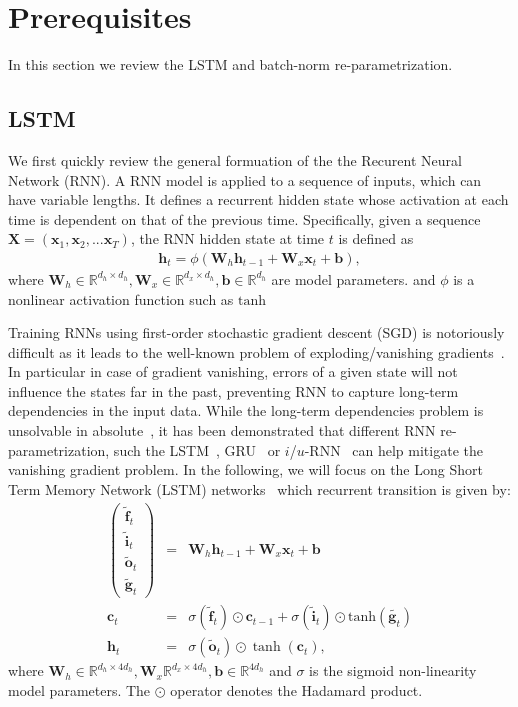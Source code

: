 \documentclass{article} %
\newcommand{\vect}[1]{\mathbf{#1}}
\newcommand{\mat}[1]{\mathbf{#1}}
\newcommand{\ewprod}{\odot}
\newcommand{\reals}{\mathbb{R}}
\begin{document}
\section{Prerequisites}
\label{sec:prerequisites}

In this section we review the LSTM and batch-norm re-parametrization.

\subsection{LSTM}

We first quickly review the general formuation of the the Recurent Neural Network (RNN).
A RNN model is applied to a sequence of inputs, which can have variable lengths.
It defines a recurrent hidden state whose activation at each time is dependent on that of the previous time. Specifically, given a sequence
$\mat{X} = ( \vect{x}_1, \vect{x}_2, ... \vect{x}_T )$, the RNN  hidden state at time $t$ is defined as
\begin{eqnarray}
  \mat{h}_t = \phi(\mat{W}_h \vect{h}_{t-1} + \mat{W}_x  \vect{x}_t + \vect{b}),
\end{eqnarray}
where $\mat{W}_h \in \reals^{d_h \times d_h}, \mat{W}_x \in \reals^{d_x \times d_h}, \vect{b} \in \reals^{d_h}$ are model parameters.
and $\phi$  is a nonlinear activation function such as $\mathrm{tanh}$


Training RNNs using first-order stochastic gradient descent (SGD) is notoriously difficult as it leads to the
well-known problem of exploding/vanishing gradients~\cite{bengio1994learning,hochreiter1991untersuchungen,pascanudifficulty}.
In particular in case of gradient vanishing, errors of a given state will not influence the states far in the past,
 preventing RNN to capture long-term dependencies in the input data.
 While the long-term dependencies problem is unsolvable in absolute~\cite{bengio1994learning}, it has been demonstrated that different RNN re-parametrization, such the LSTM~\cite{lstm}, GRU~\cite{cho2014learning} or $i$/$u$-RNN~\cite{le2015simple,urnn} can help mitigate the vanishing gradient problem.
 In the following, we will focus on the  Long Short Term Memory Network  (LSTM) networks~\cite{lstm}  which recurrent transition is given by:
\begin{eqnarray}
\left(\begin{array}{ccc}
\tilde{\vect{f}}_t \\
\tilde{\vect{i}}_t \\
\tilde{\vect{o}}_t \\
\tilde{\vect{g}}_t
\end{array}\right)
 &=&
 \mat{W}_h \vect{h}_{t-1} +
 \mat{W}_x \vect{x}_t +
 \vect{b}
 \\
\vect{c}_t &= &\sigma(\tilde{\vect{f}}_t) \ewprod \vect{c}_{t-1} +
\sigma(\tilde{\vect{i}}_t) \ewprod \mathrm{tanh}(\tilde{\vect{g}_t}) \\
\vect{h}_t &= &\sigma(\tilde{\vect{o}}_t) \ewprod \tanh(\vect{c}_t),
\end{eqnarray}
where $\vect{W}_h \in \reals^{d_h \times 4 d_h}, \vect{W}_x \reals^{d_x \times 4 d_h}, \vect{b} \in \reals^{4 d_h}$ and $\sigma$ is the sigmoid non-linearity model parameters. The $\ewprod$ operator denotes the Hadamard product.
\end{document}
